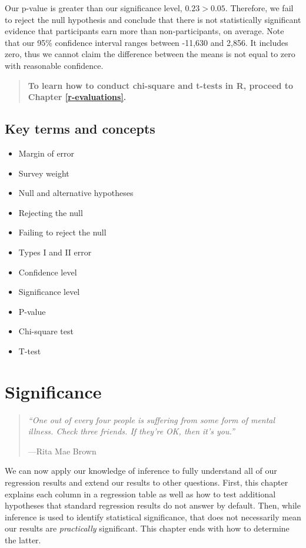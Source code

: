 \documentclass[
]{book}
\providecommand{\tightlist}{%
  \setlength{\itemsep}{0pt}\setlength{\parskip}{0pt}}
\begin{document}
Our p-value is greater than our significance level, \(0.23>0.05\). Therefore, we fail to reject the null hypothesis and conclude that there is not statistically significant evidence that participants earn more than non-participants, on average. Note that our 95\% confidence interval ranges between -11,630 and 2,856. It includes zero, thus we cannot claim the difference between the means is not equal to zero with reasonable confidence.

\begin{quote}
\textbf{To learn how to conduct chi-square and t-tests in R, proceed to Chapter \ref{r-evaluations}.}
\end{quote}

\hypertarget{kt11}{%
\section{Key terms and concepts}\label{kt11}}

\begin{itemize}
\tightlist
\item
  Margin of error
\item
  Survey weight
\item
  Null and alternative hypotheses
\item
  Rejecting the null
\item
  Failing to reject the null
\item
  Types I and II error
\item
  Confidence level
\item
  Significance level
\item
  P-value
\item
  Chi-square test
\item
  T-test
\end{itemize}

\hypertarget{significance}{%
\chapter{Significance}\label{significance}}

\begin{quote}
\emph{``One out of every four people is suffering from some form of mental illness. Check three friends. If they're OK, then it's you.''}

---Rita Mae Brown
\end{quote}

We can now apply our knowledge of inference to fully understand all of our regression results and extend our results to other questions. First, this chapter explains each column in a regression table as well as how to test additional hypotheses that standard regression results do not answer by default. Then, while inference is used to identify statistical significance, that does not necessarily mean our results are \emph{practically} significant. This chapter ends with how to determine the latter.
\end{document}
